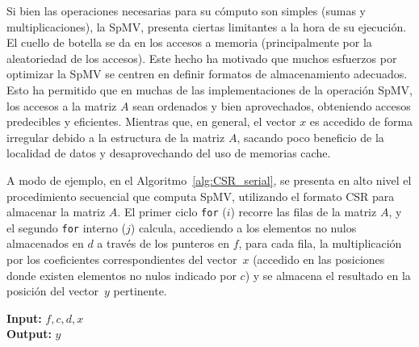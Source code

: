 Si bien las operaciones necesarias para su cómputo son simples (sumas y multiplicaciones), la SpMV, presenta ciertas limitantes a la hora de su ejecución.
El cuello de botella se da en los accesos a memoria (principalmente por la aleatoriedad de los accesos). 
Este hecho ha motivado que muchos esfuerzos por optimizar la SpMV se centren en definir formatos de almacenamiento adecuados. Esto ha permitido que en muchas de las implementaciones de la operación SpMV, los accesos a la matriz $A$ sean ordenados y bien aprovechados, obteniendo accesos predecibles y eficientes. Mientras que, en general, el vector $x$ es accedido de forma irregular debido a la estructura de la matriz $A$, sacando poco beneficio de la localidad de datos y desaprovechando del uso de memorias cache. %

A modo de ejemplo, en el Algoritmo~\ref{alg:CSR_serial}, se presenta en alto nivel el procedimiento secuencial que computa SpMV, utilizando el formato CSR para almacenar la matriz $A$. El primer ciclo \texttt{for} ($i$) recorre las filas de la matriz $A$, y el segundo \texttt{for} interno ($j$) calcula, accediendo a los elementos no nulos almacenados en $d$ a través de los punteros en $f$, para cada fila, la multiplicación por los coeficientes correspondientes del vector~$x$ (accedido en las posiciones donde existen elementos no nulos indicado por $c$) y se almacena el resultado en la posición del vector~$y$ pertinente.

\begin{algorithm}[th]
\textbf{Input:} $f, c, d, x$ \\
\textbf{Output:} $y$
\begin{algorithmic}
\ENDFOR
\ENDFOR
\end{algorithmic}
\caption{
Cálculo secuencial de la multiplicación matriz dispersa-vector (SpMV) con la matriz dispersa $A$ almacenada en el formato CSR. 
El vector $d$ almacena los valores distintos de cero de A por filas, $f$ contiene los índices que especifican el primer elemento de cada fila en el vector $d$; y $c$ contiene el índice de columna de cada elemento en la matriz original. 
Los elementos distintos de cero dentro de cada fila están ordenados por índice de columna.
}
\label{alg:CSR_serial}
\end{algorithm}


